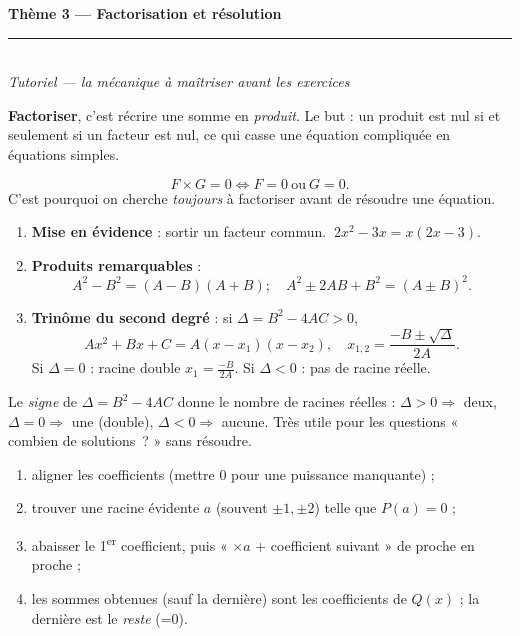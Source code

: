 \documentclass[11pt,a4paper]{article}
\begin{document}
\begin{center}
{\LARGE\bfseries\color{primarydark} Thème 3 — Factorisation et résolution}\\[2pt]
{\color{primary}\rule{0.5\textwidth}{1.2pt}}\\[4pt]
{\small\itshape Tutoriel — la mécanique à maîtriser avant les exercices}
\end{center}

\vspace{1mm}
\noindent \textbf{Factoriser}, c'est récrire une somme en \emph{produit}. Le but : un produit est nul
si et seulement si un facteur est nul, ce qui casse une équation compliquée en équations simples.

\begin{cle}
\[ F\times G=0 \iff F=0\ \text{ou}\ G=0. \]
C'est pourquoi on cherche \emph{toujours} à factoriser avant de résoudre une équation.
\end{cle}

\begin{cle}
\begin{enumerate}[leftmargin=1.5em,topsep=1pt,itemsep=1pt]
  \item \textbf{Mise en évidence} : sortir un facteur commun. $\ 2x^{2}-3x=x(2x-3)$.
  \item \textbf{Produits remarquables} :
  \[ A^{2}-B^{2}=(A-B)(A+B);\quad A^{2}\pm 2AB+B^{2}=(A\pm B)^{2}. \]
  \item \textbf{Trinôme du second degré} : si $\Delta=B^{2}-4AC>0$,
  \[ Ax^{2}+Bx+C=A(x-x_1)(x-x_2),\quad x_{1,2}=\frac{-B\pm\sqrt{\Delta}}{2A}. \]
  Si $\Delta=0$ : racine double $x_1=\tfrac{-B}{2A}$. Si $\Delta<0$ : pas de racine réelle.
\end{enumerate}
\end{cle}

\begin{piege}
Le \emph{signe} de $\Delta=B^{2}-4AC$ donne le nombre de racines réelles : $\Delta>0\Rightarrow$ deux,
$\Delta=0\Rightarrow$ une (double), $\Delta<0\Rightarrow$ aucune. Très utile pour les questions « combien
de solutions~? » sans résoudre.
\end{piege}

\begin{methode}
\begin{enumerate}[leftmargin=1.6em,topsep=1pt,itemsep=0.5pt]
  \item aligner les coefficients (mettre $0$ pour une puissance manquante) ;
  \item trouver une racine évidente $a$ (souvent $\pm1,\pm2$) telle que $P(a)=0$ ;
  \item abaisser le 1\textsuperscript{er} coefficient, puis « $\times a$ + coefficient suivant » de proche en proche ;
  \item les sommes obtenues (sauf la dernière) sont les coefficients de $Q(x)$ ; la dernière est le \emph{reste} (=$0$).
\end{enumerate}
\end{methode}
\end{document}
